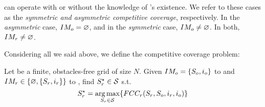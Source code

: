 \opp can operate with or without the knowledge of \rob's existence. We refer to these cases as the {\em symmetric and asymmetric competitive coverage}, respectively.
In the {\em asymmetric} case, $IM_o=\varnothing$, and in the {\em symmetric} case, $IM_o \neq \varnothing$. In both, $IM_r \neq \varnothing $.

Considering all we said above, we define the competitive coverage problem:
\begin{mdframed}[backgroundcolor=gray!20] 
\begin{definition}
Let \w be a finite, obstacles-free grid of size $N$. Given $IM_o=\lbrace S_o ,i_o \rbrace$ to \rob and $IM_r \in \lbrace \varnothing, \lbrace S_r, i_r \rbrace \rbrace$ to \opp, find $S_r^\star \in \mathcal{S}$ s.t.
\begin{dmath*}[compact]
S_\rob^\star =\argmax_{S_\rob\in\mathcal{S}} \lbrace \fcc_{r}(S_\rob, S_\opp, i_\rob, i_\opp ) \rbrace
\end{dmath*}
\end{definition}
\end{mdframed}
